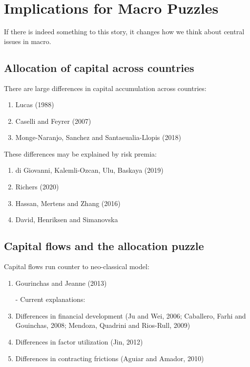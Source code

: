 \documentclass[12pt,letter]{article}
\theoremstyle{break} \theorembodyfont{\normalfont\itshape}
\theoremstyle{break}
\theoremstyle{break} \theorembodyfont{\normalfont\itshape}
\theoremstyle{break} \theorembodyfont{\normalfont\itshape}
\begin{document}
\section{Implications for Macro Puzzles}
If there is indeed something to this story, it changes how we think
about central issues in macro.

\subsection{Allocation of capital across countries}
There are large differences in capital accumulation across countries:
\begin{enumerate}
\item Lucas (1988)
\item Caselli and Feyrer (2007)
\item Monge-Naranjo, Sanchez and Santaeualia-Llopis (2018)
\end{enumerate}
These differences may be explained by risk premia:
\begin{enumerate}
\item di Giovanni, Kalemli-Ozcan, Ulu, Baskaya (2019)
\item Richers (2020)
\item Hassan, Mertens and Zhang (2016)
\item David, Henriksen and Simanovska
\end{enumerate}

\subsection{Capital flows and the allocation puzzle}
Capital flows run counter to neo-classical model:
\begin{enumerate}
\item Gourinchas and Jeanne (2013)
\item[-] Current explanations:
\item Differences in financial development (Ju and Wei, 2006;
  Caballero, Farhi and Gouinchas, 2008; Mendoza, Quadrini and
  Rios-Rull, 2009)
\item Differences in factor utilization (Jin, 2012)
\item Differences in contracting frictions (Aguiar and Amador, 2010)
\end{enumerate}
\end{document}

